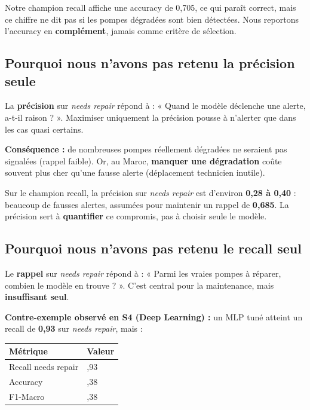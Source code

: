 \documentclass[11pt,a4paper]{report}
\begin{document}
Notre champion recall affiche une accuracy de 0,705, ce qui paraît correct, mais ce chiffre ne dit pas si les pompes dégradées sont bien détectées. Nous reportons l'accuracy en \textbf{complément}, jamais comme critère de sélection.

\subsection{Pourquoi nous n'avons pas retenu la précision seule}

La \textbf{précision} sur \textit{needs repair} répond à : « Quand le modèle déclenche une alerte, a-t-il raison ? ». Maximiser uniquement la précision pousse à n'alerter que dans les cas quasi certains.

\textbf{Conséquence :} de nombreuses pompes réellement dégradées ne seraient pas signalées (rappel faible). Or, au Maroc, \textbf{manquer une dégradation} coûte souvent plus cher qu'une fausse alerte (déplacement technicien inutile).

Sur le champion recall, la précision sur \textit{needs repair} est d'environ \textbf{0,28 à 0,40} : beaucoup de fausses alertes, assumées pour maintenir un rappel de \textbf{0,685}. La précision sert à \textbf{quantifier} ce compromis, pas à choisir seule le modèle.

\subsection{Pourquoi nous n'avons pas retenu le recall seul}

Le \textbf{rappel} sur \textit{needs repair} répond à : « Parmi les vraies pompes à réparer, combien le modèle en trouve ? ». C'est central pour la maintenance, mais \textbf{insuffisant seul}.

\textbf{Contre-exemple observé en S4 (Deep Learning) :} un MLP tuné atteint un recall de \textbf{0,93} sur \textit{needs repair}, mais :

{\small
\begin{longtable}{@{}>{\raggedright\arraybackslash}p{}>{\raggedright\arraybackslash}p{}@{}}
\toprule
\rowcolor{EHTPTableHead}Métrique & Valeur \\
\midrule
Recall needs repair & 0,93 \\
Accuracy & 0,38 \\
F1-Macro & 0,38 \\
\bottomrule
\end{longtable}
}
\end{document}
